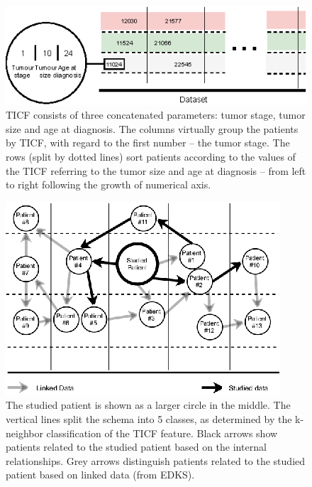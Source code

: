 \documentclass{bmcart}
\begin{document}
\begin{backmatter}
\begin{figure}[h!]
  \centering
  \includegraphics{Fig4.eps}
  \caption{
     TICF consists of three concatenated
parameters: tumor stage, tumor size and age at diagnosis. The columns
virtually group the patients by TICF, with regard to the first number
{}-- the tumor stage. The rows (split by dotted lines) sort patients
according to the values of the TICF referring to the tumor size and age
at diagnosis {}-- from left to right following the growth of numerical
axis. 
  }
  \label{figure_4}
\end{figure}



\begin{figure}[h!]
  \centering
  \includegraphics{Fig5.eps}
  \caption{
     The studied patient is shown as a larger circle in the
middle. The vertical lines split the schema into 5 classes, as
determined by the k-neighbor classification of the TICF feature. Black
arrows show patients related to the studied patient based on the
internal relationships. Grey arrows distinguish patients related to the
studied patient based on linked data (from EDKS).
  }
  \label{figure_5}
\end{figure}



\end{backmatter}
\end{document}

